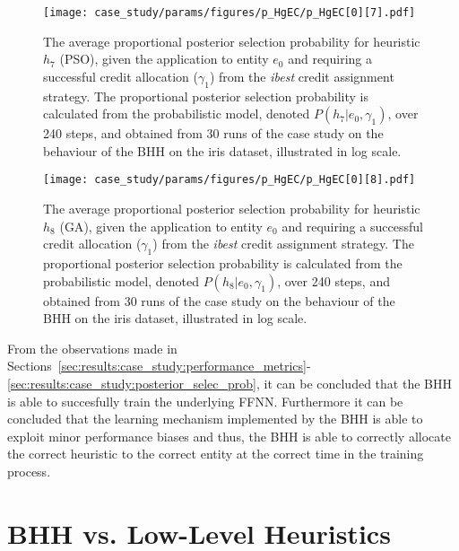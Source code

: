 \begin{figure}[htpb]
	\centering
	\texttt{[image: case\_study/params/figures/p\_HgEC/p\_HgEC[0][7].pdf]}
	\caption{The average proportional posterior selection probability for heuristic $h_{7}$ (\acs{PSO}), given the application to entity $e_{0}$ and requiring a successful credit allocation ($\gamma_{1}$) from the \textit{ibest} credit assignment strategy. The proportional posterior selection probability is calculated from the probabilistic model, denoted $P(h_{7} \vert e_{0}, \gamma_{1})$, over 240 steps, and obtained from 30 runs of the case study on the behaviour of the \acs{BHH} on the iris dataset, illustrated in log scale.}
	\label{fig:results:case_study:p_HgEC:0:7}
\end{figure}

\begin{figure}[htpb]
	\centering
	\texttt{[image: case\_study/params/figures/p\_HgEC/p\_HgEC[0][8].pdf]}
	\caption{The average proportional posterior selection probability for heuristic $h_{8}$ (\acs{GA}), given the application to entity $e_{0}$ and requiring a successful credit allocation ($\gamma_{1}$) from the \textit{ibest} credit assignment strategy. The proportional posterior selection probability is calculated from the probabilistic model, denoted $P(h_{8} \vert e_{0}, \gamma_{1})$, over 240 steps, and obtained from 30 runs of the case study on the behaviour of the \acs{BHH} on the iris dataset, illustrated in log scale.}
	\label{fig:results:case_study:p_HgEC:0:8}
\end{figure}

From the observations made in Sections~\ref{sec:results:case_study:performance_metrics}-\ref{sec:results:case_study:posterior_selec_prob}, it can be concluded that the \acs{BHH} is able to succesfully train the underlying \acs{FFNN}. Furthermore it can be concluded that the learning mechanism implemented by the \acs{BHH} is able to exploit minor performance biases and thus, the \acs{BHH} is able to correctly allocate the correct heuristic to the correct entity at the correct time in the training process.

\section{BHH vs. Low-Level Heuristics}\label{sec:results:standalone}

